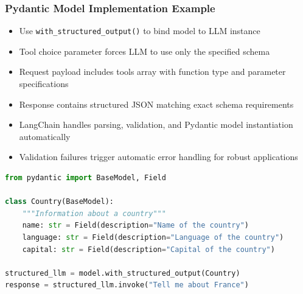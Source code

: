 \begin{frame}[fragile]\frametitle{Pydantic Model Implementation Example}
      \begin{itemize}
	\item Use \texttt{with\_structured\_output()} to bind model to LLM instance
	\item Tool choice parameter forces LLM to use only the specified schema
	\item Request payload includes tools array with function type and parameter specifications
	\item Response contains structured JSON matching exact schema requirements
	\item LangChain handles parsing, validation, and Pydantic model instantiation automatically
	\item Validation failures trigger automatic error handling for robust applications
	  \end{itemize}

\begin{lstlisting}[language=Python, basicstyle=\scriptsize\ttfamily]
from pydantic import BaseModel, Field

class Country(BaseModel):
    """Information about a country"""
    name: str = Field(description="Name of the country")
    language: str = Field(description="Language of the country")
    capital: str = Field(description="Capital of the country")

structured_llm = model.with_structured_output(Country)
response = structured_llm.invoke("Tell me about France")
\end{lstlisting}
\end{frame}
